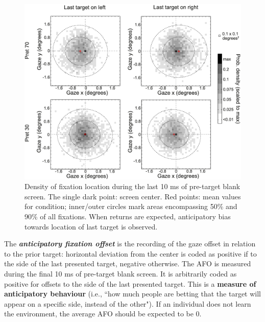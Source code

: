 \begin{figure}[!ht]
    \centering
    \captionsetup{width=.8\linewidth}
    \includegraphics[width=0.6\linewidth]{images/afo.png}
    \caption{Density of fixation location during the last 10 ms of pre-target blank screen. The single dark point: screen center. Red points: mean values for condition; inner/outer circles mark areas encompassing 50\% and 90\% of all fixations. When returns are expected, anticipatory bias towards location of last target is observed.}
    \label{fig:afo}
\end{figure}

The \textbf{\textit{anticipatory fixation offset}} is the recording of the gaze offset in relation to the prior target: horizontal deviation from the center is coded as positive if to the side of the last presented target, negative otherwise. The AFO is measured during the final 10 ms of pre-target blank screen. It is arbitrarily coded as positive for offsets to the side of the last presented target. This is a \textbf{measure of anticipatory behaviour} (i.e., ``how much people are betting that the target will appear on a specific side, instead of the other"). If an individual does not learn the environment, the average AFO should be expected to be 0.
